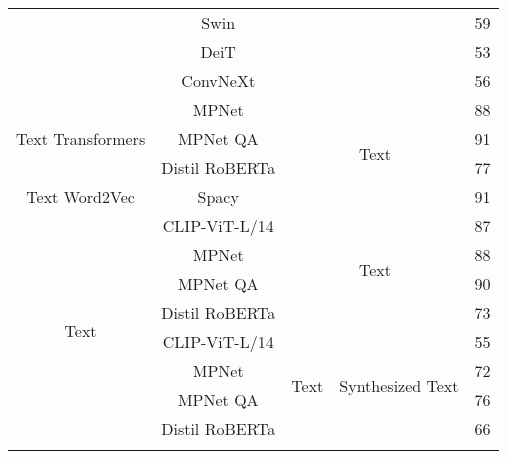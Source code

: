 \documentclass{article}
\begin{document}
\begin{table}[!htb]
\begin{tabular}{@{}ccccc@{}}
                                     & Swin                   & \multicolumn{2}{c}{}                       & 59                             \\
                                     & DeiT                   & \multicolumn{2}{c}{}                       & 53                             \\
                                     & ConvNeXt               & \multicolumn{2}{c}{}                       & 56                             \\ \midrule
\multirow{3}{*}{Text   Transformers} & MPNet                  & \multicolumn{2}{c}{\multirow{4}{*}{Text}}  & 88                             \\
                                     & MPNet QA               & \multicolumn{2}{c}{}                       & 91                             \\
                                     & Distil RoBERTa         & \multicolumn{2}{c}{}                       & 77                             \\ \midrule
Text Word2Vec                        & Spacy                  & \multicolumn{2}{c}{Text}                       & 91                 \\ \bottomrule 
\multirow{16}{*}{Text}  & CLIP-ViT-L/14                   & \multicolumn{2}{c}{\multirow{4}{*}{Text}}                             & 87                             \\
  & MPNet                  & \multicolumn{2}{c}{}                                                  & 88                             \\
  &  MPNet QA               & \multicolumn{2}{c}{}                                                  & 90                             \\
  & Distil RoBERTa         & \multicolumn{2}{c}{}                                                  & 73                             \\ \cmidrule(l){2-5}
  & CLIP-ViT-L/14                    & \multirow{4}{*}{Text}             & \multirow{4}{*}{Synthesized Text} & 55                             \\
  & MPNet                  &                                   &                                   & 72                             \\
  & MPNet QA               &                                   &                                   & 76                             \\
  & Distil RoBERTa         &                                   &                                   & 66                             \\ \cmidrule(l){2-5}

\end{tabular}
\end{table}
\end{document}
